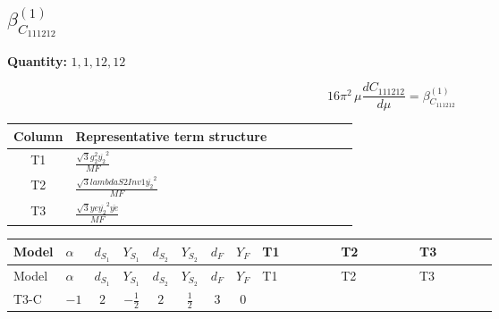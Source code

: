 \documentclass[8pt]{article}
\begin{document}
\begin{landscape}
\section*{$\beta_{C_{111212}}^{(1)}$}
\noindent\textbf{Quantity: }$\mathrm{1,1,12,12}$\par\smallskip
\[16\pi^2\,\mu\frac{d C_{111212}}{d\mu}=\beta_{C_{111212}}^{(1)}\]
\begin{center}
\begin{tabular}{@{}c >{\raggedright\arraybackslash}p{0.82\linewidth}@{}}
\toprule
Column & Representative term structure \\
\midrule
T1 & \(\displaystyle \frac{\sqrt{3} g_{2}^{2} \overline{y_{2}}^{2}}{MF}\) \\
\midrule
T2 & \(\displaystyle \frac{\sqrt{3} lambdaS2Inv1 \overline{y_{2}}^{2}}{MF}\) \\
\midrule
T3 & \(\displaystyle \frac{\sqrt{3} ye \overline{y_{2}}^{2} \overline{ye}}{MF}\) \\
\midrule
\bottomrule
\end{tabular}
\end{center}
\smallskip
\tiny
\begin{longtable}{@{}llcccccc >{\raggedright\arraybackslash}p{0.21\linewidth} >{\raggedright\arraybackslash}p{0.21\linewidth} >{\raggedright\arraybackslash}p{0.21\linewidth}@{}}
\toprule
Model & $\alpha$ & $d_{S_1}$ & $Y_{S_1}$ & $d_{S_2}$ & $Y_{S_2}$ & $d_F$ & $Y_F$ & T1 & T2 & T3 \\
\midrule
\endfirsthead
\toprule
Model & $\alpha$ & $d_{S_1}$ & $Y_{S_1}$ & $d_{S_2}$ & $Y_{S_2}$ & $d_F$ & $Y_F$ & T1 & T2 & T3 \\
\midrule
\endhead
T3-C & $-1$ & $2$ & $-\frac{1}{2}$ & $2$ & $\frac{1}{2}$ & $3$ & $0$ & \scriptsize\adjustbox{max width=\linewidth}{$\begin{gathered} \frac{\sqrt{3} g_{2}^{2} \overline{y_{2}}^{2}}{4 MF}\end{gathered}$} & \scriptsize\adjustbox{max width=\linewidth}{$\begin{gathered} \frac{\sqrt{3} lambdaS2Inv1 \overline{y_{2}}^{2}}{6 MF}\end{gathered}$} & \scriptsize\adjustbox{max width=\linewidth}{$\begin{gathered} - \frac{\sqrt{3} ye \overline{y_{2}}^{2} \overline{ye}}{12 MF}\end{gathered}$} \\
\midrule
\bottomrule
\end{longtable}
\clearpage

\end{landscape}
\end{document}
